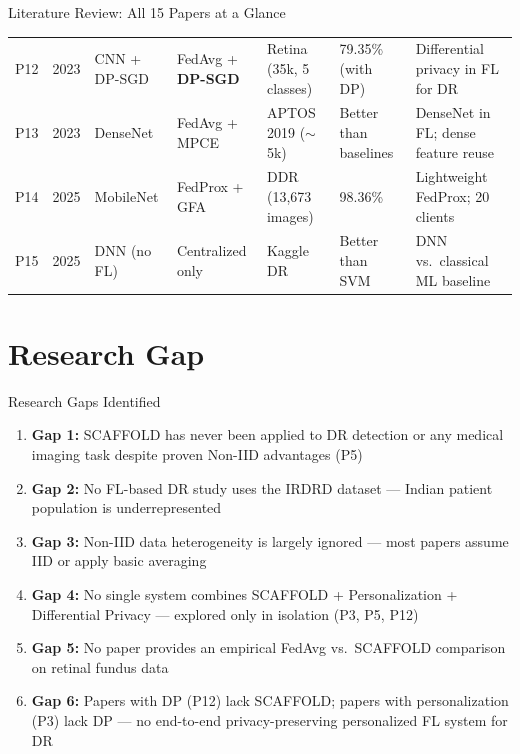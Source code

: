 \documentclass[aspectratio=169, 11pt]{beamer}
\begin{document}
\begin{frame}{Literature Review: All 15 Papers at a Glance}
{\begin{tabular}{cllllll}
    P12 & 2023 & CNN + DP-SGD       & FedAvg + \textbf{DP-SGD}  & Retina (35k, 5 classes)   & 79.35\% (with DP)     & Differential privacy in FL for DR \\
    P13 & 2023 & DenseNet           & FedAvg + MPCE             & APTOS 2019 ($\sim$5k)     & Better than baselines & DenseNet in FL; dense feature reuse \\
    P14 & 2025 & MobileNet          & FedProx + GFA             & DDR (13,673 images)       & 98.36\%               & Lightweight FedProx; 20 clients \\
    P15 & 2025 & DNN (no FL)        & Centralized only          & Kaggle DR                 & Better than SVM       & DNN vs.\ classical ML baseline \\
    \bottomrule
  \end{tabular}
  }
\end{frame}

\section{Research Gap}

\begin{frame}{Research Gaps Identified}
  \begin{enumerate}\small
    \item \textbf{Gap 1:} SCAFFOLD has \alert{never been applied to DR detection} or any medical imaging task despite proven Non-IID advantages (P5)
    \item \textbf{Gap 2:} No FL-based DR study uses the \alert{IRDRD dataset} --- Indian patient population is underrepresented
    \item \textbf{Gap 3:} Non-IID data heterogeneity is \alert{largely ignored} --- most papers assume IID or apply basic averaging
    \item \textbf{Gap 4:} \alert{No single system combines SCAFFOLD + Personalization + Differential Privacy} --- explored only in isolation (P3, P5, P12)
    \item \textbf{Gap 5:} No paper provides an empirical \alert{FedAvg vs.\ SCAFFOLD comparison} on retinal fundus data
    \item \textbf{Gap 6:} Papers with DP (P12) lack SCAFFOLD; papers with personalization (P3) lack DP --- \alert{no end-to-end privacy-preserving personalized FL system for DR}
  \end{enumerate}
\end{frame}
\end{document}
